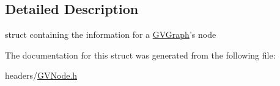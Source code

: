 \subsection{\-Detailed \-Description}
struct containing the information for a \hyperlink{class_g_v_graph}{\-G\-V\-Graph}'s node 

\-The documentation for this struct was generated from the following file\-:\begin{DoxyCompactItemize}
\item 
headers/\hyperlink{_g_v_node_8h}{\-G\-V\-Node.\-h}\end{DoxyCompactItemize}
